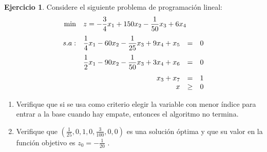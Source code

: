\documentclass[12pt]{article}
\theoremstyle{definition}
\newtheorem{ejer}{Ejercicio}
\newcommand{\bej}{\begin{ejer}}
\newcommand{\fej}{\end{ejer}}
\begin{document}
\bej
Considere el siguiente problema de programación lineal:
\[
    \begin{array}{rrcl}
    \min & \multicolumn{2}{l}{z = -\dfrac{3}{4}x_1+150x_2-\dfrac{1}{50}x_3+6x_4} \\[1em]
    s.a: & \dfrac{1}{4}x_1-60x_2-\dfrac{1}{25}x_3+9x_4+x_5 & = & 0 \\[1em]
     & \dfrac{1}{2}x_1-90x_2-\dfrac{1}{50}x_3+3x_4+x_6 & = & 0 \\[1em]
     & x_3+x_7 & = & 1 \\
     & x & \geq & 0
    \end{array}
\]
\begin{enumerate}[label=\alph*)]
    \item Verifique que si se usa como criterio elegir la variable con menor índice para entrar a la base cuando hay empate, entonces el algoritmo no termina.
    \item Verifique que $(\frac{1}{25}, 0, 1, 0, \frac{3}{100}, 0, 0)$ es una solución óptima y que su valor en la función objetivo es $z_0 = -\frac{1}{20}$ .
\end{enumerate}
\fej


%
\end{document}
